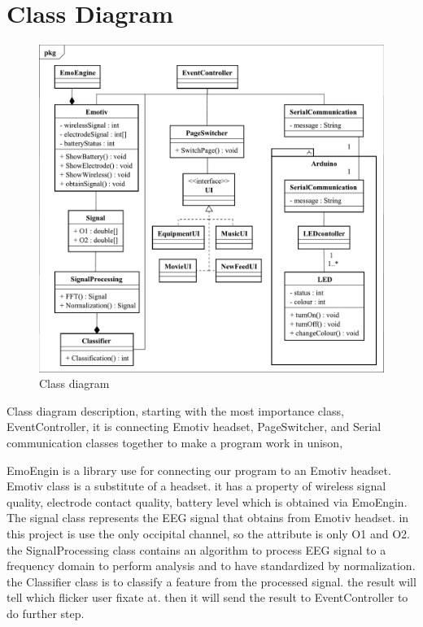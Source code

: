 \newpage
\section{Class Diagram}

\begin{figure}[ht]
	\centering
	\includegraphics[width=\textwidth]{chapter5/Class.pdf}
	\caption{Class diagram}
\end{figure}

Class diagram description, starting with the most importance class,   EventController, it is connecting Emotiv headset, PageSwitcher, and Serial communication classes together to make a program work in unison,

EmoEngin is a library use for connecting our program to an Emotiv headset.  Emotiv class is a substitute of a headset. it has a property of wireless signal quality, electrode contact quality, battery level which is obtained via EmoEngin. The signal class represents the EEG signal that obtains from Emotiv headset. in this project is use the only occipital channel, so the attribute is only O1 and O2. the SignalProcessing class contains an algorithm to process EEG signal to a frequency domain to perform analysis and to have standardized by normalization. the Classifier class is to classify a feature from the processed signal. the result will tell which flicker user fixate at. then it will send the result to EventController to do further step.

